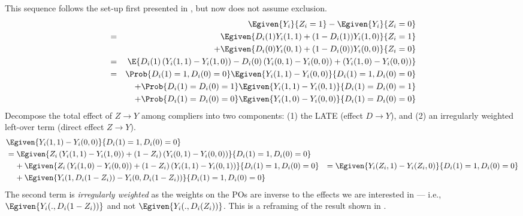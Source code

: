This sequence follows the set-up first presented in \citet[Section~2]{imbens1994identification}, but now does not assume exclusion.
\begin{align*}
    & &\Egiven{Y_i}{Z_i = 1} - \Egiven{Y_i}{Z_i = 0} \\
    &=& \Egiven{D_i(1) Y_i(1,1) + (1 - D_i(1)) Y_i(1,0)}{Z_i = 1} \\
    &&+ \Egiven{D_i(0) Y_i(0,1) + (1 - D_i(0)) Y_i(0,0)}{Z_i = 0} \\
    &=& \E{D_i(1) \left(Y_i(1,1) - Y_i(1,0)\right)
            - D_i(0) \left(Y_i(0,1) - Y_i(0,0)\right)
            + \left(Y_i(1,0) - Y_i(0,0)\right)} \\
    &=& \Prob{D_i(1) = 1, D_i(0) = 0}
        \Egiven{Y_i(1,1) - Y_i(0,0)}{D_i(1) = 1, D_i(0) = 0} \\
        &&+ \Prob{D_i(1) = D_i(0) = 1}
            \Egiven{Y_i(1,1) - Y_i(0,1)}{D_i(1) = D_i(0) = 1} \\
        &&+ \Prob{D_i(1) = D_i(0) = 0}
            \Egiven{Y_i(1,0) - Y_i(0,0)}{D_i(1) = D_i(0) = 0}
\end{align*}
Decompose the total effect of  $Z \to Y$ among compliers into two components: (1) the LATE (effect $D \to Y$), and (2) an irregularly weighted left-over term (direct effect $Z \to Y$).
\begin{align*}
    &\Egiven{Y_i(1,1) - Y_i(0,0)}{D_i(1) = 1, D_i(0) = 0} \\
    &=
    \Egiven{ Z_i \left(Y_i(1, 1) - Y_i(1, 0) \right)
        + (1 - Z_i) \left(Y_i(0, 1) - Y_i(0, 0) \right)}{
            D_i(1) = 1, D_i(0) = 0} \\
    &\;\;\;\; + \Egiven{ Z_i \left(Y_i(1, 0) - Y_i(0, 0) \right)
        + (1 - Z_i) \left(Y_i(1, 1) - Y_i(0, 1) \right)}{
            D_i(1) = 1, D_i(0) = 0}
    &=
    \Egiven{ Y_i(Z_i, 1) - Y_i(Z_i, 0)}{ D_i(1) = 1, D_i(0) = 0} \\
    &\;\;\;\; + \Egiven{ Y_i(1, D_i(1 - Z_i)) - Y_i(0, D_i(1 - Z_i))}{
            D_i(1) = 1, D_i(0) = 0}
\end{align*}
The second term is \textit{irregularly weighted} as the weights on the POs are inverse to the effects we are interested in --- i.e., $\Egiven{ Y_i(., D_i(1 - Z_i))}$ and not $\Egiven{ Y_i(., D_i(Z_i))}$.
This is a reframing of the result shown in \cite[Equation~(3)]{imai2010identification}.

